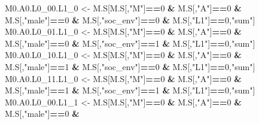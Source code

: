 \documentclass[
]{book}
\newenvironment{Shaded}{\begin{snugshade}}{\end{snugshade}}
\newcommand{\DecValTok}[1]{\textcolor[rgb]{0.00,0.00,0.81}{#1}}
\newcommand{\NormalTok}[1]{#1}
\newcommand{\OtherTok}[1]{\textcolor[rgb]{0.56,0.35,0.01}{#1}}
\newcommand{\SpecialCharTok}[1]{\textcolor[rgb]{0.81,0.36,0.00}{\textbf{#1}}}
\newcommand{\StringTok}[1]{\textcolor[rgb]{0.31,0.60,0.02}{#1}}
\begin{document}
\begin{Shaded}
\begin{Highlighting}[]
\NormalTok{  M0.A0.L0\_00.L1\_0 }\OtherTok{\textless{}{-}}\NormalTok{ M.S[M.S[,}\StringTok{"M"}\NormalTok{]}\SpecialCharTok{==}\DecValTok{0} \SpecialCharTok{\&}\NormalTok{ M.S[,}\StringTok{"A"}\NormalTok{]}\SpecialCharTok{==}\DecValTok{0} \SpecialCharTok{\&}\NormalTok{ M.S[,}\StringTok{"male"}\NormalTok{]}\SpecialCharTok{==}\DecValTok{0} \SpecialCharTok{\&} 
\NormalTok{                            M.S[,}\StringTok{"soc\_env"}\NormalTok{]}\SpecialCharTok{==}\DecValTok{0} \SpecialCharTok{\&}\NormalTok{ M.S[,}\StringTok{"L1"}\NormalTok{]}\SpecialCharTok{==}\DecValTok{0}\NormalTok{,}\StringTok{"sum"}\NormalTok{]}
\NormalTok{  M0.A0.L0\_01.L1\_0 }\OtherTok{\textless{}{-}}\NormalTok{ M.S[M.S[,}\StringTok{"M"}\NormalTok{]}\SpecialCharTok{==}\DecValTok{0} \SpecialCharTok{\&}\NormalTok{ M.S[,}\StringTok{"A"}\NormalTok{]}\SpecialCharTok{==}\DecValTok{0} \SpecialCharTok{\&}\NormalTok{ M.S[,}\StringTok{"male"}\NormalTok{]}\SpecialCharTok{==}\DecValTok{0} \SpecialCharTok{\&} 
\NormalTok{                            M.S[,}\StringTok{"soc\_env"}\NormalTok{]}\SpecialCharTok{==}\DecValTok{1} \SpecialCharTok{\&}\NormalTok{ M.S[,}\StringTok{"L1"}\NormalTok{]}\SpecialCharTok{==}\DecValTok{0}\NormalTok{,}\StringTok{"sum"}\NormalTok{]}
\NormalTok{  M0.A0.L0\_10.L1\_0 }\OtherTok{\textless{}{-}}\NormalTok{ M.S[M.S[,}\StringTok{"M"}\NormalTok{]}\SpecialCharTok{==}\DecValTok{0} \SpecialCharTok{\&}\NormalTok{ M.S[,}\StringTok{"A"}\NormalTok{]}\SpecialCharTok{==}\DecValTok{0} \SpecialCharTok{\&}\NormalTok{ M.S[,}\StringTok{"male"}\NormalTok{]}\SpecialCharTok{==}\DecValTok{1} \SpecialCharTok{\&} 
\NormalTok{                            M.S[,}\StringTok{"soc\_env"}\NormalTok{]}\SpecialCharTok{==}\DecValTok{0} \SpecialCharTok{\&}\NormalTok{ M.S[,}\StringTok{"L1"}\NormalTok{]}\SpecialCharTok{==}\DecValTok{0}\NormalTok{,}\StringTok{"sum"}\NormalTok{]}
\NormalTok{  M0.A0.L0\_11.L1\_0 }\OtherTok{\textless{}{-}}\NormalTok{ M.S[M.S[,}\StringTok{"M"}\NormalTok{]}\SpecialCharTok{==}\DecValTok{0} \SpecialCharTok{\&}\NormalTok{ M.S[,}\StringTok{"A"}\NormalTok{]}\SpecialCharTok{==}\DecValTok{0} \SpecialCharTok{\&}\NormalTok{ M.S[,}\StringTok{"male"}\NormalTok{]}\SpecialCharTok{==}\DecValTok{1} \SpecialCharTok{\&} 
\NormalTok{                            M.S[,}\StringTok{"soc\_env"}\NormalTok{]}\SpecialCharTok{==}\DecValTok{1} \SpecialCharTok{\&}\NormalTok{ M.S[,}\StringTok{"L1"}\NormalTok{]}\SpecialCharTok{==}\DecValTok{0}\NormalTok{,}\StringTok{"sum"}\NormalTok{]}
\NormalTok{  M0.A0.L0\_00.L1\_1 }\OtherTok{\textless{}{-}}\NormalTok{ M.S[M.S[,}\StringTok{"M"}\NormalTok{]}\SpecialCharTok{==}\DecValTok{0} \SpecialCharTok{\&}\NormalTok{ M.S[,}\StringTok{"A"}\NormalTok{]}\SpecialCharTok{==}\DecValTok{0} \SpecialCharTok{\&}\NormalTok{ M.S[,}\StringTok{"male"}\NormalTok{]}\SpecialCharTok{==}\DecValTok{0} \SpecialCharTok{\&} 

\end{Highlighting}
\end{Shaded}
\end{document}
